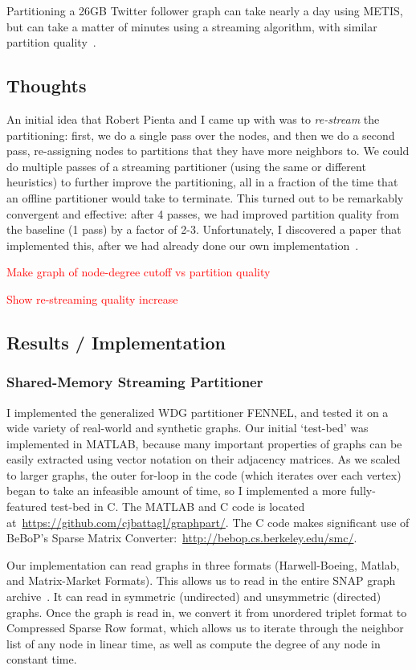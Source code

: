 \documentclass[11pt]{article}
\newcommand\warning[1]{\textcolor{red}{#1}}
\begin{document}
Partitioning a 26GB Twitter follower graph can take nearly a day using METIS, but can take a matter of minutes using a streaming algorithm, with similar partition quality~\cite{tsourakakis2012fennel}. 

\subsection{Thoughts}
An initial idea that Robert Pienta and I came up with was to \textit{re-stream} the partitioning: first, we do a single pass over the nodes, and then we do a second pass, re-assigning nodes to partitions that they have more neighbors to. We could do multiple passes of a streaming partitioner (using the same or different heuristics) to further improve the partitioning, all in a fraction of the time that an offline partitioner would take to terminate.  This turned out to be remarkably convergent and effective: after 4 passes, we had improved partition quality from the baseline (1 pass) by a factor of 2-3. Unfortunately, I discovered a paper that implemented this, after we had already done our own implementation~\cite{Nishiura13}.

\warning{Make graph of node-degree cutoff vs partition quality}

\warning{Show re-streaming quality increase}

\subsection{Results / Implementation}
\subsubsection{Shared-Memory Streaming Partitioner}

I implemented the generalized WDG partitioner FENNEL, and tested it on a wide variety of real-world and synthetic graphs. Our initial `test-bed' was implemented in MATLAB, because many important properties of graphs can be easily extracted using vector notation on their adjacency matrices. As we scaled to larger graphs, the outer for-loop in the code (which iterates over each vertex) began to take an infeasible amount of time, so I implemented a more fully-featured test-bed in C. The MATLAB and C code is located at~\url{https://github.com/cjbattagl/graphpart/}. The C code makes significant use of BeBoP's Sparse Matrix Converter:~\url{http://bebop.cs.berkeley.edu/smc/}.

Our implementation can read graphs in three formats (Harwell-Boeing, Matlab, and Matrix-Market Formats). This allows us to read in the entire SNAP graph archive~\cite{Leskovec-data}. It can read in symmetric (undirected) and unsymmetric (directed) graphs. Once the graph is read in, we convert it from unordered triplet format to Compressed Sparse Row format, which allows us to iterate through the neighbor list of any node in linear time, as well as compute the degree of any node in constant time.
\end{document}
